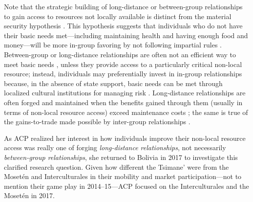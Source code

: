\documentclass[bibauthoryear]{aa}
\begin{document}
Note that the strategic building of long-distance or between-group relationships to gain access to resources not locally available is distinct from the material security hypothesis \citep{hruschka2013economic, hruschka2014impartial}. This hypothesis suggests that individuals who do not have their basic needs met---including maintaining health and having enough food and money---will be more in-group favoring by not following impartial rules \citep{hruschka2014impartial}. Between-group or long-distance relationships are often not an efficient way to meet basic needs \citep{minnis1985social}, unless they provide access to a particularly critical non-local resource; instead, individuals may preferentially invest in in-group relationships because, in the absence of state support, basic needs can be met through localized cultural institutions for managing risk \citep{pisorjones2020}. Long-distance relationships are often forged and maintained when the benefits gained through them (usually in terms of non-local resource access) exceed maintenance costs \citep{pisor2019evolution}; the same is true of the gains-to-trade made possible by inter-group relationships \citep{bellmoya}.

As ACP realized her interest in how individuals improve their non-local resource access was really one of forging \textit{long-distance relationships}, not necessarily \textit{between-group relationships}, she returned to Bolivia in 2017 to investigate this clarified research question. Given how different the Tsimane’ were from the Mosetén and Interculturales in their mobility and market participation---not to mention their game play in 2014--15---ACP focused on the Interculturales and the Moset\'en in 2017.
	
\end{document}
